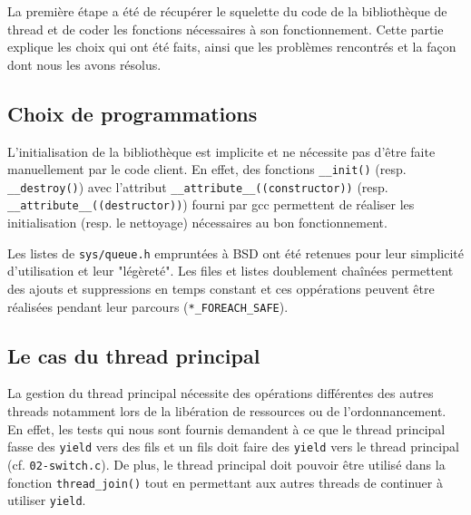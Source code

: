 La première étape a été de récupérer le squelette du code de la bibliothèque de thread et de coder les fonctions nécessaires à son fonctionnement. Cette partie explique les choix qui ont été faits, ainsi que les problèmes rencontrés et la façon dont nous les avons résolus.

\subsection{Choix de programmations}

L'initialisation de la bibliothèque est implicite et ne nécessite pas d'être faite manuellement par le code client. En effet, des fonctions \verb!__init()! (resp. \verb!__destroy()!) avec l'attribut \verb!__attribute__((constructor))! (resp. \verb!__attribute__((destructor))!) fourni par gcc permettent de réaliser les initialisation (resp. le nettoyage) nécessaires au bon fonctionnement.

Les listes de \verb!sys/queue.h! empruntées à BSD ont été retenues pour leur simplicité d'utilisation et leur "légèreté". Les files et listes doublement chaînées permettent des ajouts et suppressions en temps constant et ces oppérations peuvent être réalisées pendant leur parcours (\verb!*_FOREACH_SAFE!).


\subsection{Le cas du thread principal}

La gestion du thread principal nécessite des opérations différentes des autres threads notamment lors de la libération de ressources ou de l'ordonnancement. En effet, les tests qui nous sont fournis demandent à ce que le thread principal fasse des \verb!yield! vers des fils et un fils doit faire des \verb!yield! vers le thread principal (cf. \verb!02-switch.c!). De plus, le thread principal doit pouvoir être utilisé dans la fonction \verb!thread_join()! tout en permettant aux autres threads de continuer à utiliser \verb!yield!.
